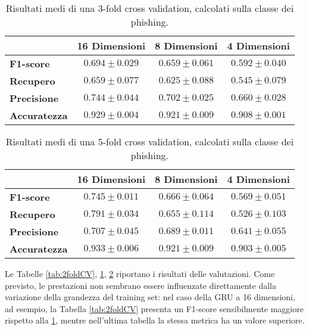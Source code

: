 \documentclass[../../main.tex]{subfiles}
\begin{document}
    \begin{table}[H]
        \centering
        \begin{tabular}{lccc}
            \toprule
            {} &                      \textbf{16 Dimensioni} & \textbf{8 Dimensioni} & \textbf{4 Dimensioni} \\
            \midrule
            \textbf{F1-score }      &      $0.694 \pm 0.029$ & $0.659 \pm 0.061$ & $0.592 \pm 0.040$\\
            \textbf{Recupero   }    &      $0.659 \pm 0.077$ & $0.625 \pm 0.088$ & $0.545 \pm 0.079$\\
            \textbf{Precisione}     &      $0.744 \pm 0.044$ & $0.702 \pm 0.025$ & $0.660 \pm 0.028$\\
            \textbf{Accuratezza }   &      $0.929 \pm 0.004$ & $0.921 \pm 0.009$ & $0.908 \pm 0.001$\\
            \bottomrule
        \end{tabular}
        \caption{Risultati medi di una 3-fold cross validation, calcolati sulla classe dei phishing.}
        \label{tab:3foldCV}
    \end{table}

    \begin{table}[H]
        \centering
        \begin{tabular}{lccc}
            \toprule
            {} &                      \textbf{16 Dimensioni} & \textbf{8 Dimensioni} & \textbf{4 Dimensioni} \\
            \midrule
            \textbf{F1-score }      &      $0.745 \pm 0.011$ & $0.666 \pm 0.064$ & $0.569 \pm 0.051$\\
            \textbf{Recupero   }    &      $0.791 \pm 0.034$ & $0.655 \pm 0.114$ & $0.526 \pm 0.103$\\
            \textbf{Precisione}     &      $0.707 \pm 0.045$ & $0.689 \pm 0.011$ & $0.641 \pm 0.055$\\
            \textbf{Accuratezza }      &      $0.933 \pm 0.006$ & $0.921 \pm 0.009$ & $0.903 \pm 0.005$\\
            \bottomrule
        \end{tabular}
        \caption{Risultati medi di una 5-fold cross validation, calcolati sulla classe dei phishing.}
        \label{tab:5foldCV}
    \end{table}

    Le Tabelle \ref{tab:2foldCV}, \ref{tab:3foldCV}, \ref{tab:5foldCV} riportano i risultati delle valutazioni. Come previsto, le prestazioni non sembrano essere influenzate direttamente dalla variazione della grandezza del training set: nel caso della GRU a 16 dimensioni, ad esempio, la Tabella \ref{tab:2foldCV} presenta un F1-score sensibilmente maggiore rispetto alla \ref{tab:3foldCV}, mentre nell'ultima tabella la stessa metrica ha un valore superiore.
\end{document}
